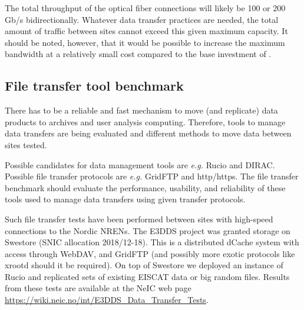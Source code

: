 \documentclass[12pt,a4paper]{article}
\begin{document}

The total throughput of the optical fiber connections will likely be 100 or 200 Gb/s bidirectionally. 
Whatever data transfer practices are needed, the total amount of traffic between \ED sites cannot exceed this given maximum capacity. It should be noted, however, that it would be possible to increase the maximum bandwidth at a relatively small cost compared to the base investment of \ED.

\subsection{File transfer tool benchmark}
There has to be a reliable and fast mechanism to move (and replicate) \ED data products to archives and user analysis computing. 
Therefore, tools to manage data transfers are being evaluated and different methods to move data between sites tested.

Possible candidates for data management tools are \emph{e.g.} Rucio and DIRAC. Possible file transfer protocols are \emph{e.g.} GridFTP and http/https.
The file transfer benchmark should evaluate the performance, usability, and reliability of these tools used to manage data transfers using given transfer protocols.


Such file transfer tests have been performed between sites with high-speed connections to the Nordic NRENs.  The E3DDS project was granted storage on Swestore (SNIC allocation 2018/12-18).  This is a distributed dCache system with access through WebDAV, and GridFTP (and possibly more exotic protocols like xrootd should it be required). 
On top of Swestore we deployed an instance of Rucio and replicated sets of existing EISCAT data or big random files. Results from these tests are available at the NeIC web page {\url{ https://wiki.neic.no/int/E3DDS_Data_Transfer_Tests}}.
\end{document}
